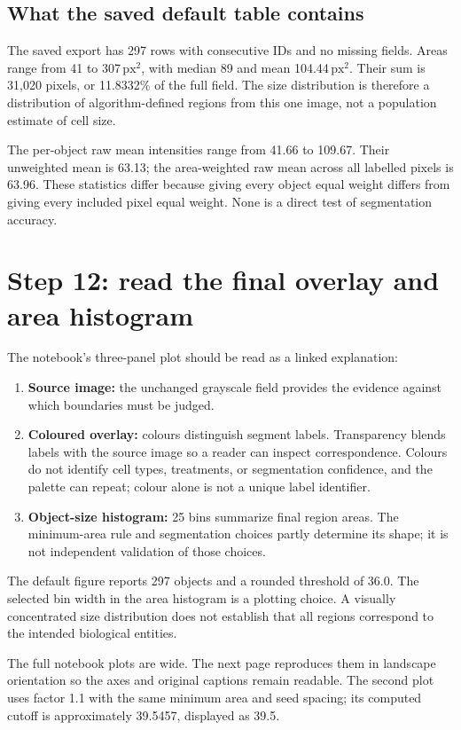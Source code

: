 \documentclass[11pt,letterpaper]{article}
\newcommand{\pxsq}{\ensuremath{\mathrm{px}^{2}}}
\begin{document}
\subsection{What the saved default table contains}
The saved export has 297 rows with consecutive IDs and no missing fields. Areas range from 41 to 307\,\pxsq, with median 89 and mean 104.44\,\pxsq. Their sum is 31,020 pixels, or 11.8332\% of the full field. The size distribution is therefore a distribution of algorithm-defined regions from this one image, not a population estimate of cell size.

The per-object raw mean intensities range from 41.66 to 109.67. Their unweighted mean is 63.13; the area-weighted raw mean across all labelled pixels is 63.96. These statistics differ because giving every object equal weight differs from giving every included pixel equal weight. None is a direct test of segmentation accuracy.

\section{Step 12: read the final overlay and area histogram}
\label{sec:finalplots}

The notebook's three-panel plot should be read as a linked explanation:
\begin{enumerate}
  \item \textbf{Source image:} the unchanged grayscale field provides the evidence against which boundaries must be judged.
  \item \textbf{Coloured overlay:} colours distinguish segment labels. Transparency blends labels with the source image so a reader can inspect correspondence.\cite{colour} Colours do not identify cell types, treatments, or segmentation confidence, and the palette can repeat; colour alone is not a unique label identifier.
  \item \textbf{Object-size histogram:} 25 bins summarize final region areas. The minimum-area rule and segmentation choices partly determine its shape; it is not independent validation of those choices.
\end{enumerate}
The default figure reports 297 objects and a rounded threshold of 36.0. The selected bin width in the area histogram is a plotting choice. A visually concentrated size distribution does not establish that all regions correspond to the intended biological entities.

The full notebook plots are wide. The next page reproduces them in landscape orientation so the axes and original captions remain readable. The second plot uses factor 1.1 with the same minimum area and seed spacing; its computed cutoff is approximately 39.5457, displayed as 39.5.
\end{document}

